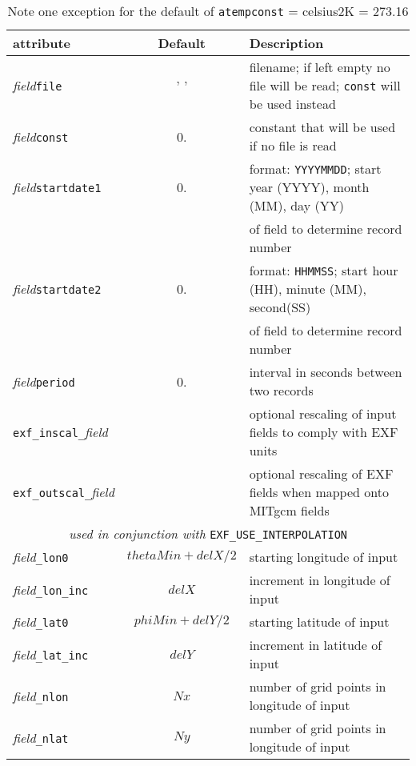 \begin{table}[h!]
\centering
  \label{tab:pkg:exf:runtime_attributes}
  {\footnotesize
    \begin{tabular}{|l|c|l|}
      \hline 
      \textbf{attribute} &  \textbf{Default} &  \textbf{Description}  \\
      \hline \hline
         \textit{field}\texttt{file} & ' ' & 
           filename; if left empty no file will be read; \texttt{const} will be used instead \\
         \textit{field}\texttt{const} & 0. &
           constant that will be used if no file is read  \\
         \textit{field}\texttt{startdate1} & 0. & 
           format: \texttt{YYYYMMDD}; start year (YYYY), month (MM), day (YY) \\
           ~&~& of field to determine record number \\
         \textit{field}\texttt{startdate2} & 0. &
           format: \texttt{HHMMSS}; start hour (HH), minute (MM), second(SS) \\
           ~&~& of field to determine record number\\
         \textit{field}\texttt{period} & 0. &
           interval in seconds between two records \\
         \texttt{exf\_inscal\_}\textit{field}& ~ & 
           optional rescaling of input fields to comply with EXF units \\
         \texttt{exf\_outscal\_}\textit{field}& ~ &
           optional rescaling of EXF fields when mapped onto MITgcm fields \\
         \hline
         \multicolumn{3}{|c|}{\textit{used in conjunction with} 
                              \texttt{EXF\_USE\_INTERPOLATION}} \\
         \hline
         \textit{field}\texttt{\_lon0} & $thetaMin+delX/2$  & 
           starting longitude of input \\
         \textit{field}\texttt{\_lon\_inc} & $delX$ &
           increment in longitude of input \\
         \textit{field}\texttt{\_lat0} &  $phiMin+delY/2$ &
           starting latitude of input \\
         \textit{field}\texttt{\_lat\_inc} & $delY$ &
           increment in latitude of input \\
         \textit{field}\texttt{\_nlon} & $Nx$ &
           number of grid points in longitude of input \\
         \textit{field}\texttt{\_nlat} & $Ny$ &
           number of grid points in longitude of input \\
      \hline
    \end{tabular}
   }
   \caption{\newline
            Note one exception for the default of 
            \texttt{atempconst} = celsius2K = 273.16}
\end{table}

